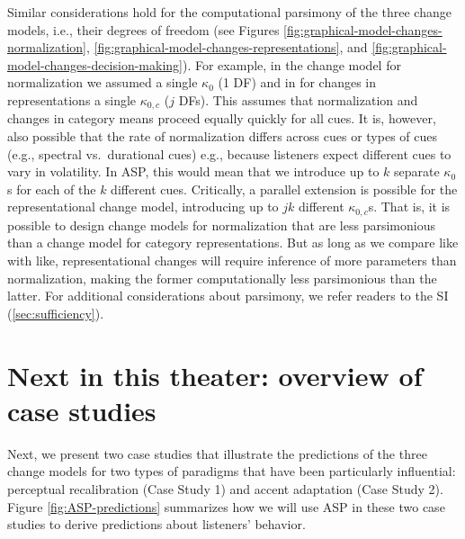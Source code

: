 \documentclass[
  11pt,
  man,floatsintext]{apa6}
\begin{document}
Similar considerations hold for the computational parsimony of the three change models, i.e., their degrees of freedom (see Figures \ref{fig:graphical-model-changes-normalization}, \ref{fig:graphical-model-changes-representations}, and \ref{fig:graphical-model-changes-decision-making}). For example, in the change model for normalization we assumed a single \(\kappa_0\) (1 DF) and in for changes in representations a single \(\kappa_{0,c}\) (\(j\) DFs). This assumes that normalization and changes in category means proceed equally quickly for all cues. It is, however, also possible that the rate of normalization differs across cues or types of cues (e.g., spectral vs.~durational cues) e.g., because listeners expect different cues to vary in volatility. In ASP, this would mean that we introduce up to \(k\) separate \(\kappa_{0}\)s for each of the \(k\) different cues. Critically, a parallel extension is possible for the representational change model, introducing up to \(jk\) different \(\kappa_{0,c}\)s. That is, it is possible to design change models for normalization that are less parsimonious than a change model for category representations. But as long as we compare like with like, representational changes will require inference of more parameters than normalization, making the former computationally less parsimonious than the latter.
For additional considerations about parsimony, we refer readers to the SI (\ref{sec:sufficiency}).

\hypertarget{next-in-this-theater-overview-of-case-studies}{%
\section{Next in this theater: overview of case studies}\label{next-in-this-theater-overview-of-case-studies}}

Next, we present two case studies that illustrate the predictions of the three change models for two types of paradigms that have been particularly influential: perceptual recalibration (Case Study 1) and accent adaptation (Case Study 2). Figure \ref{fig:ASP-predictions} summarizes how we will use ASP in these two case studies to derive predictions about listeners' behavior.
\end{document}
